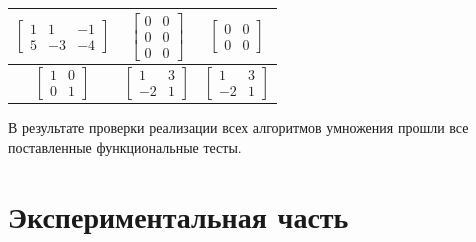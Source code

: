 \documentclass[12pt, a4paper]{report}
\begin{document}
\begin{table}[ht!]
\begin{center}
\begin{tabular}{|c|c|c|}
			$\begin{bmatrix}1 & 1 & -1\\5 & -3 & -4\end{bmatrix}$ &
			$\begin{bmatrix}0 & 0\\0 & 0\\0 & 0\end{bmatrix}$ &
			$\begin{bmatrix}0 & 0\\0 & 0\end{bmatrix}$\\\hline
			
			$\begin{bmatrix}1 & 0\\0 & 1\end{bmatrix}$ &
			$\begin{bmatrix}1 & 3\\-2 & 1\end{bmatrix}$ &
			$\begin{bmatrix}1 & 3\\-2 & 1\end{bmatrix}$\\\hline

			\end{tabular}
		\end{center}
	\end{table}

	В результате проверки реализации всех алгоритмов умножения прошли все поставленные функциональные тесты.

	\chapter{Экспериментальная часть}
\end{document}
